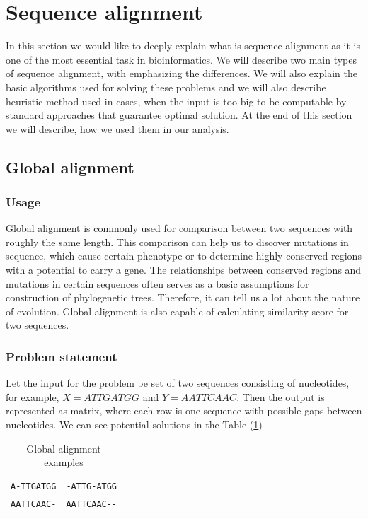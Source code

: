 \section{Sequence alignment}
In this section we would like to deeply explain what is sequence alignment as it is one of the most essential task in bioinformatics.
We will describe two main types of sequence alignment, with emphasizing the differences.
We will also explain the basic algorithms used for solving these problems and we will also describe heuristic method used in cases, when the input is too big to be computable by standard approaches that guarantee optimal solution.
At the end of this section we will describe, how we used them in our analysis.

\subsection{Global alignment}
\subsubsection{Usage}
Global alignment is commonly used for comparison between two sequences with roughly the same length.
This comparison can help us to discover mutations in sequence, which cause certain phenotype or to determine highly conserved regions with a potential to carry a gene.
The relationships between conserved regions and mutations in certain sequences often serves as a basic assumptions for construction of phylogenetic trees.
Therefore, it can tell us a lot about the nature of evolution.
Global alignment is also capable of calculating similarity score for two sequences.

\subsubsection{Problem statement}
Let the input for the problem be set of two sequences consisting of nucleotides, for example, $ X = ATTGATGG $ and $ Y = AATTCAAC $.
Then the output is represented as matrix, where each row is one sequence with possible gaps between nucleotides.
We can see potential solutions in the Table (\ref{tab:potsol})

\begin{table}
 \centering
   \begin{tabular}{ l | r }
   \verb|A-TTGATGG| & \verb|-ATTG-ATGG| \\
   \verb|AATTCAAC-| & \verb|AATTCAAC--| \\
   \end{tabular}
 \caption{Global alignment examples}
 \label{tab:potsol}
\end{table} 

